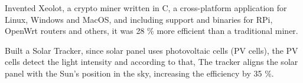 \documentclass[a4paper]{deedy-resume} %
\begin{document}
\begin{minipage}[t]{0.66\textwidth}

Invented Xeolot, a crypto miner written in C, a cross-platform application for Linux, Windows and MacOS, and including support and binaries for RPi, OpenWrt routers and others, it was 28 \% more efficient than a traditional miner. \\

\sectionspace %





Built a Solar Tracker, since solar panel uses photovoltaic cells (PV cells), the PV cells detect the light intensity and according to that, The tracker aligns the solar panel with the Sun's position in the sky, increasing the efficiency by 35 \%. \\

\sectionspace %



\end{minipage} %
\end{document}
